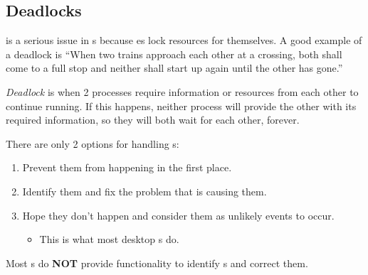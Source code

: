 \subsection{Deadlocks}\label{subsec:Deadlocks}
 is a serious issue in s because es lock resources for themselves.
A good example of a deadlock is ``When two trains approach each other at a crossing, both shall come to a full stop and neither shall start up again until the other has gone.''

\begin{definition}[Deadlock]\label{def:Deadlock}
  \emph{Deadlock} is when 2 processes require information or resources from each other to continue running.
  If this happens, neither process will provide the other with its required information, so they will both wait for each other, forever.
\end{definition}

There are only 2 options for handling s:
\begin{enumerate}[noitemsep]
\item Prevent them from happening in the first place.
\item Identify them and fix the problem that is causing them.
\item Hope they don't happen and consider them as unlikely events to occur.
  \begin{itemize}[noitemsep]
  \item This is what most desktop s do.
  \end{itemize}
\end{enumerate}

Most s do \textbf{NOT} provide functionality to identify s and correct them.

